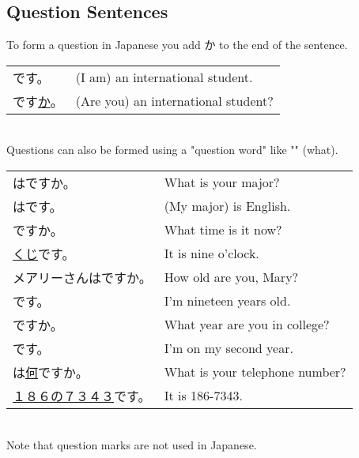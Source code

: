 \documentclass{article}
\newenvironment{gex}
{
	\,\\
	\renewcommand{\arraystretch}{1.5}
    \begin{tabular}{m{20em} l}
}
{
	\end{tabular}
	\renewcommand{\arraystretch}{1}
	\\
}
\begin{document}
   \subsection{Question Sentences}
   To form a question in Japanese you add か to the end of the sentence.
   \begin{gex}
   \ruby{留学生}{りゅうがくせい}です。& (I am) an international student. \\
   \ruby{留学生}{りゅうがくせい}です\underline{か}。 & (Are you) an international student?
   \end{gex}
   Questions can also be formed using a "question word" like "" (what). 
   \begin{gex}
   \ruby{専攻}{せんこう}は\underline{\ruby{何}{なん}}ですか。 & What is your major? \\
   \ruby{専攻}{せんこう}は\underline{\ruby{英}{えい}\ruby{語}{ご}}です。 & (My major) is English. \\
   \ruby{今}{いま}\underline{\ruby{何}{なん}\ruby{時}{じ}}ですか。 & What time is it now? \\
   \ruby{今}{いま}\underline{くじ}です。 & It is nine o'clock. \\
   メアリーさんは\underline{\ruby{何}{なん}\ruby{歳}{さい}}ですか。 & How old are you, Mary? \\
   \underline{\ruby{十}{じゅう}\ruby{九}{きゅう}\ruby{歳}{さい}}です。 & I'm nineteen years old. \\
   \underline{\ruby{何}{なん}\ruby{年生}{ねんせい}}ですか。 & What year are you in college? \\
   \underline{\ruby{二}{に}\ruby{年生}{ねんせい}}です。 & I'm on my second year. \\
   \ruby{電話}{でんわ}\ruby{番号}{ばんごう}は\underline{何}ですか。 & What is your telephone number? \\
   \underline{１８６の７３４３}です。 & It is 186-7343.
   \end{gex}   
   Note that question marks are not used in Japanese. \\
   
   
   
   
\end{document}
